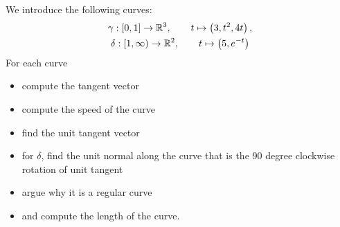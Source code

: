 \documentclass[11pt]{article}
\begin{document}
\begin{exercise}
    We introduce the following curves:
    \begin{gather*}
        \gamma : [0,1] \rightarrow \mathbb{R}^{3}, \qquad t \mapsto \left( 3, t^2, 4t \right),
        \\
        \delta : [1,\infty) \rightarrow \mathbb{R}^{2}, \qquad t \mapsto \left( 5, e^{-t} \right)
    \end{gather*}
    For each curve
    \begin{itemize}
        \item compute the tangent vector
        \item compute the speed of the curve
        \item find the unit tangent vector
        \item for $\delta$, find the unit normal along the curve that is the 90 degree clockwise rotation of unit tangent
        \item argue why it is a regular curve
        \item and compute the length of the curve.
    \end{itemize}
\end{exercise}
\end{document}
